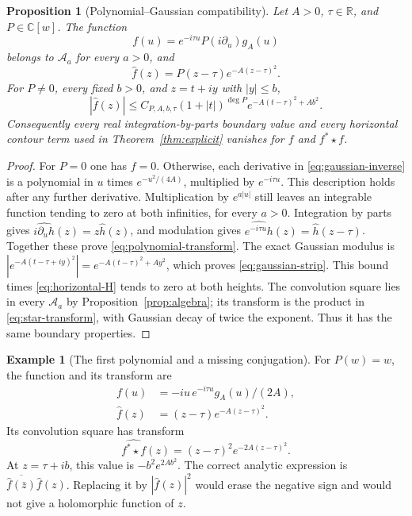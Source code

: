 \documentclass[11pt]{article}
\newtheorem{proposition}[theorem]{Proposition}
\theoremstyle{definition}
\newtheorem{example}[theorem]{Example}
\theoremstyle{remark}
\numberwithin{equation}{section}
\newcommand{\R}{\mathbb R}
\newcommand{\C}{\mathbb C}
\newcommand{\A}{\mathcal A}
\begin{document}
\begin{proposition}[Polynomial--Gaussian compatibility]
\label{prop:polynomial-gaussian}
Let $A>0$, $\tau\in\R$, and $P\in\C[w]$.  The function
\begin{equation}
 f(u)=e^{-i\tau u}P(i\partial_u)g_A(u)
 \label{eq:gaussian-inverse}
\end{equation}
belongs to $\A_a$ for every $a>0$, and
\begin{equation}
 \widehat f(z)=P(z-\tau)e^{-A(z-\tau)^2}.
 \label{eq:polynomial-transform}
\end{equation}
For $P\ne0$, every fixed $b>0$, and $z=t+iy$ with $|y|\leq b$,
\begin{equation}
 |\widehat f(z)|\leq C_{P,A,b,\tau}(1+|t|)^{\deg P}
                             e^{-A(t-\tau)^2+A b^2}.
 \label{eq:gaussian-strip}
\end{equation}
Consequently every real integration-by-parts boundary value and every
horizontal contour term used in Theorem~\ref{thm:explicit} vanishes for
$f$ and $f^*\star f$.
\end{proposition}

\begin{proof}
For $P=0$ one has $f=0$.  Otherwise, each derivative in
\eqref{eq:gaussian-inverse} is a polynomial in $u$ times
$e^{-u^2/(4A)}$, multiplied by $e^{-i\tau u}$.
This description holds after any further derivative.
Multiplication by $e^{a|u|}$ still leaves an integrable function tending
to zero at both infinities, for every $a>0$.
Integration by parts gives
$\widehat{i\partial_u h}(z)=z\widehat h(z)$, and modulation gives
$\widehat{e^{-i\tau u}h}(z)=\widehat h(z-\tau)$.
Together these prove \eqref{eq:polynomial-transform}.
The exact Gaussian modulus is
$|e^{-A(t-\tau+iy)^2}|=e^{-A(t-\tau)^2+Ay^2}$,
which proves \eqref{eq:gaussian-strip}.
This bound times \eqref{eq:horizontal-H} tends to zero at both heights.
The convolution square lies in every $\A_a$ by
Proposition~\ref{prop:algebra}; its transform is the product in
\eqref{eq:star-transform}, with Gaussian decay of twice the exponent.
Thus it has the same boundary properties.
\end{proof}

\begin{example}[The first polynomial and a missing conjugation]
For $P(w)=w$, the function and its transform are
\[
 \begin{aligned}
 f(u)&=-iu\,e^{-i\tau u}g_A(u)/(2A),\\
 \widehat f(z)&=(z-\tau)e^{-A(z-\tau)^2}.
 \end{aligned}
\]
Its convolution square has transform
\[
 \widehat{f^*\star f}(z)=(z-\tau)^2e^{-2A(z-\tau)^2}.
\]
At $z=\tau+ib$, this value is $-b^2e^{2Ab^2}$.
The correct analytic expression is
$\overline{\widehat f(\bar z)}\widehat f(z)$.
Replacing it by $|\widehat f(z)|^2$ would erase the negative sign and would
not give a holomorphic function of $z$.
\end{example}
\end{document}
